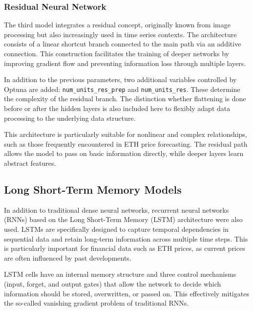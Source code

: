 

\subsubsection{Residual Neural Network}

The third model integrates a residual concept, originally known from image processing but also increasingly used in time series contexts.
The architecture consists of a linear shortcut branch connected to the main path via an additive connection.
This construction facilitates the training of deeper networks by improving gradient flow and preventing information loss through multiple layers.

In addition to the previous parameters, two additional variables controlled by Optuna are added: \verb|num_units_res_prep| and \verb|num_units_res|.
These determine the complexity of the residual branch.
The distinction whether flattening is done before or after the hidden layers is also included here to flexibly adapt data processing to the underlying data structure.

This architecture is particularly suitable for nonlinear and complex relationships, such as those frequently encountered in ETH price forecasting.
The residual path allows the model to pass on basic information directly, while deeper layers learn abstract features.



\subsection{Long Short-Term Memory Models}

In addition to traditional dense neural networks, recurrent neural networks (RNNs) based on the Long Short-Term Memory (LSTM) architecture were also used.
LSTMs are specifically designed to capture temporal dependencies in sequential data and retain long-term information across multiple time steps.
This is particularly important for financial data such as ETH prices, as current prices are often influenced by past developments.

LSTM cells have an internal memory structure and three control mechanisms (input, forget, and output gates) that allow the network to decide which information should be stored, overwritten, or passed on.
This effectively mitigates the so-called vanishing gradient problem of traditional RNNs.

